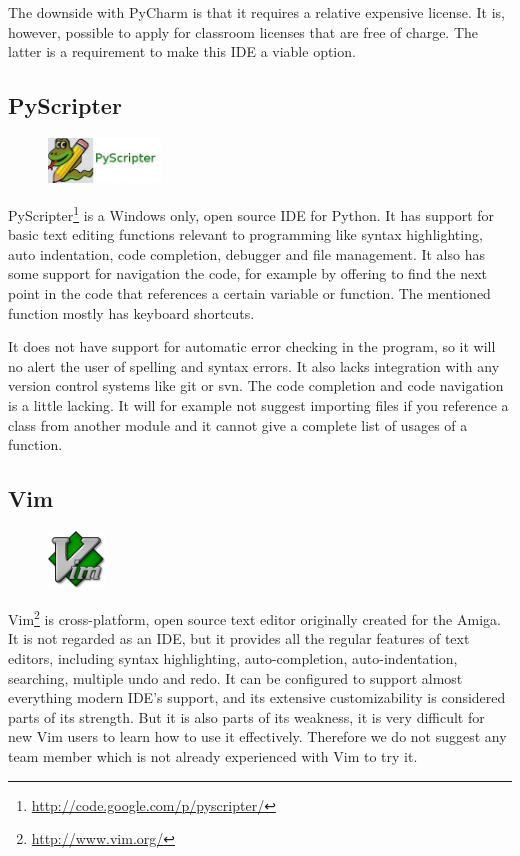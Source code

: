 The downside with PyCharm is that it requires a relative expensive license. It
is, however, possible to apply for classroom licenses that are free of charge.
The latter is a requirement to make this IDE a viable option.

\subsection{PyScripter}
\begin{figure}
	\vspace{-20pt}
	\includegraphics[width=3cm]{./planning/img/pyscripter_logo}
	\vspace{-20pt}
\end{figure}
PyScripter\footnote{\url{http://code.google.com/p/pyscripter/}}
is a Windows only, open source IDE for Python. It has support for
basic text editing functions relevant to programming like syntax highlighting,
auto indentation, code completion, debugger and file management. It also has
some support for navigation the code, for example by offering to find the next
point in the code that references a certain variable or function. The mentioned
function mostly has keyboard shortcuts.

It does not have support for automatic error checking in the program, so it
will no alert the user of spelling and syntax errors. It also lacks integration
with any version control systems like git or svn. The code completion and
code navigation is a little lacking. It will for example not suggest importing
files if you reference a class from another module and it cannot give a
complete list of usages of a function.

\subsection{Vim}
\begin{figure}
	\vspace{-20pt}
	\includegraphics[width=1.5cm]{./planning/img/vim_logo}
	\vspace{-20pt}
\end{figure}
Vim\footnote{\url{http://www.vim.org/}} is cross-platform, open source text
editor originally created for the Amiga. It is not regarded as an IDE, but it
provides all the regular features of text editors, including syntax
highlighting, auto-completion, auto-indentation, searching, multiple undo and
redo. It can be configured to support almost everything modern IDE’s support,
and its extensive customizability is considered parts of its strength. But it
is also parts of its weakness, it is very difficult for new Vim users to learn
how to use it effectively. Therefore we do not suggest any team member which is
not already experienced with Vim to try it.


